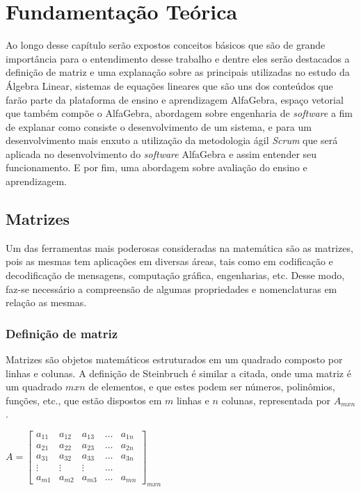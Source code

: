 \chapter{Fundamentação Teórica}
\label{cap:teoria}

\noindent Ao longo desse capítulo serão expostos conceitos básicos que são de grande importância para o entendimento desse trabalho e dentre eles serão destacados a definição de matriz e uma explanação sobre as principais utilizadas no estudo da Álgebra Linear, sistemas de equações lineares que são uns dos conteúdos que farão parte da plataforma de ensino e aprendizagem AlfaGebra, espaço vetorial que também compõe o AlfaGebra, abordagem sobre engenharia de \textit{software} a fim de explanar como consiste o desenvolvimento de um sistema, e para um desenvolvimento mais enxuto a utilização da metodologia ágil \textit{Scrum} que será aplicada no desenvolvimento do \textit{software} AlfaGebra e assim entender seu funcionamento. E por fim, uma abordagem sobre avaliação do ensino e aprendizagem.

\section{Matrizes}
\noindent Um das ferramentas mais poderosas consideradas na matemática são as matrizes, pois as mesmas tem aplicações em diversas áreas, tais como em codificação e decodificação de mensagens, computação gráfica, engenharias, etc. Desse modo, faz-se necessário a compreensão de algumas propriedades e nomenclaturas em relação as mesmas.

\subsection{Definição de matriz}
\noindent Matrizes são objetos matemáticos estruturados em um quadrado composto por linhas e colunas. A definição de Steinbruch \cite{1987:Steinbruch} é similar a citada, onde uma matriz é um quadrado $m x n$ de elementos, e que estes podem ser números, polinômios, funções, etc., que estão dispostos em $m$ linhas e $n$ colunas, representada por  $A{}_{mxn}$.\\

\begin{center}
    $A = 
    \begin{bmatrix}
        a_{11} & a_{12} & a_{13} & \ldots & a_{1n}\\ 
        a_{21} & a_{22} & a_{23} & \ldots & a_{2n}\\ 
        a_{31} & a_{32} & a_{33} & \ldots & a_{3n}\\ 
        \vdots & \vdots & \vdots & \ldots & \\ 
        a_{m1} & a_{m2} & a_{m3} & \ldots & a_{mn}
    \end{bmatrix}_{mxn}$
\end{center}

